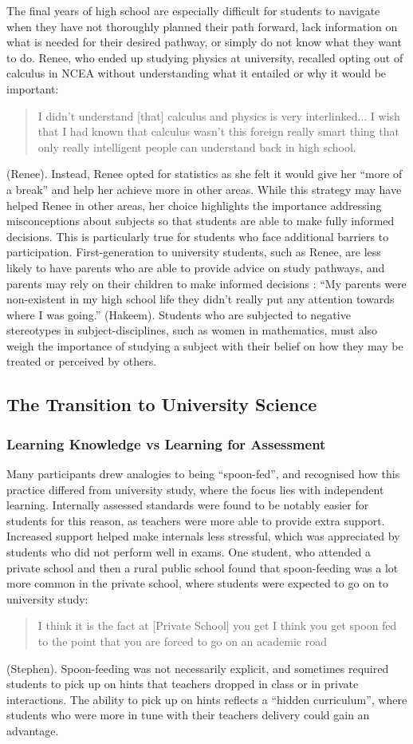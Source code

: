 \documentclass[a4paper,man,natbib]{apa6}
\begin{document}
The final years of high school are especially difficult for students to navigate when they have not thoroughly planned their path forward, lack information on what is needed for their desired pathway, or simply do not know what they want to do. Renee, who ended up studying physics at university, recalled opting out of calculus in NCEA without understanding what it entailed or why it would be important: \blockquote{I didn't understand [that] calculus and physics is very interlinked... I wish that I had known that calculus wasn't this foreign really smart thing that only really intelligent people can understand back in high school.} (Renee). Instead, Renee opted for statistics as she felt it would give her ``more of a break'' and help her achieve more in other areas. While this strategy may have helped Renee in other areas, her choice highlights the importance addressing misconceptions about subjects so that students are able to make fully informed decisions. This is particularly true for students who face additional barriers to participation. First-generation to university students, such as Renee, are less likely to have parents who are able to provide advice on study pathways, and parents may rely on their children to make informed decisions \cite{madjar2009towards}: ``My parents were non-existent in my high school life they didn't really put any attention towards where I was going.'' (Hakeem). Students who are subjected to negative stereotypes in subject-disciplines, such as women in mathematics, must also weigh the importance of studying a subject with their belief on how they may be treated or perceived by others. 

\subsection{The Transition to University Science}
\subsubsection{Learning Knowledge vs Learning for Assessment}
Many participants drew analogies to being ``spoon-fed'', and recognised how this practice differed from university study, where the focus lies with independent learning. Internally assessed standards were found to be notably easier for students for this reason, as teachers were more able to provide extra support. Increased support helped make internals less stressful, which was appreciated by students who did not perform well in exams. One student, who attended a private school and then a rural public school found that spoon-feeding was a lot more common in the private school, where students were expected to go on to university study: \blockquote{I think it is the fact at [Private School] you get I think you get spoon fed to the point that you are forced to go on an academic road}. (Stephen). Spoon-feeding was not necessarily explicit, and sometimes required students to pick up on hints that teachers dropped in class or in private interactions. The ability to pick up on hints reflects a ``hidden curriculum'', where students who were more in tune with their teachers delivery could gain an advantage. 
\end{document}
